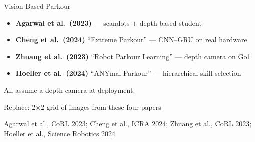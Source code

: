 \documentclass[aspectratio=169,10pt]{beamer}
\newcommand{\source}[1]{\vfill{\tiny\color{gray}#1\par}}
\newcommand{\placeholder}[2][0.7\textheight]{%
  \begin{center}
    \colorbox{gray!12}{%
      \parbox{0.85\linewidth}{\centering\vspace{#1}%
        {\small\color{gray!60}#2}%
        \vspace{#1}}%
    }%
  \end{center}
}
\begin{document}
\begin{frame}{Vision-Based Parkour}

\begin{itemize}
  \item \textbf{Agarwal et al.\ (2023)} --- scandots + depth-based student
  \item \textbf{Cheng et al.\ (2024)} ``Extreme Parkour'' ---
        CNN--GRU on real hardware
  \item \textbf{Zhuang et al.\ (2023)} ``Robot Parkour Learning'' ---
        depth camera on Go1
  \item \textbf{Hoeller et al.\ (2024)} ``ANYmal Parkour'' ---
        hierarchical skill selection
\end{itemize}

\vspace{4pt}
\begin{center}
\alert{All assume a depth camera at deployment.}
\end{center}

\placeholder[0.1\textheight]{Replace: 2$\times$2 grid of images from
these four papers}

\source{Agarwal et al., CoRL 2023; Cheng et al., ICRA 2024;
Zhuang et al., CoRL 2023; Hoeller et al., Science Robotics 2024}
\end{frame}
\end{document}
